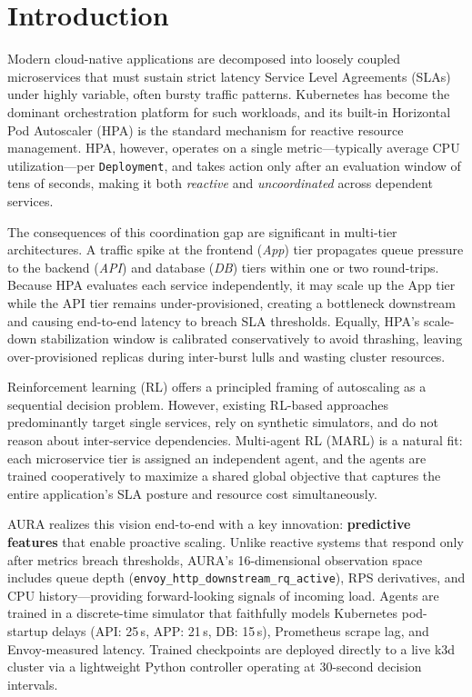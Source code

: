 \documentclass[conference]{IEEEtran}
\begin{document}
\section{Introduction}
\label{sec:intro}

Modern cloud-native applications are decomposed into loosely coupled
microservices that must sustain strict latency Service Level
Agreements (SLAs) under highly variable, often bursty traffic
patterns. Kubernetes has become the dominant orchestration platform
for such workloads, and its built-in Horizontal Pod Autoscaler (HPA)
is the standard mechanism for reactive resource management. HPA,
however, operates on a single metric---typically average CPU
utilization---per \texttt{Deployment}, and takes action only after an
evaluation window of tens of seconds, making it both \emph{reactive}
and \emph{uncoordinated} across dependent services.

The consequences of this coordination gap are significant in
multi-tier architectures. A traffic spike at the frontend
(\emph{App}) tier propagates queue pressure to the backend
(\emph{API}) and database (\emph{DB}) tiers within one or two
round-trips. Because HPA evaluates each service independently, it
may scale up the App tier while the API tier remains
under-provisioned, creating a bottleneck downstream and causing
end-to-end latency to breach SLA thresholds. Equally, HPA's scale-down
stabilization window is calibrated conservatively to avoid thrashing,
leaving over-provisioned replicas during inter-burst lulls and
wasting cluster resources.

Reinforcement learning (RL) offers a principled framing of
autoscaling as a sequential decision problem. However, existing
RL-based approaches~\cite{Rossi2019,Toka2021,Horovitz2022}
predominantly target single services, rely on synthetic simulators,
and do not reason about inter-service dependencies. Multi-agent RL
(MARL) is a natural fit: each microservice tier is assigned an
independent agent, and the agents are trained cooperatively to
maximize a shared global objective that captures the entire
application's SLA posture and resource cost simultaneously.

AURA realizes this vision end-to-end with a key innovation:
\textbf{predictive features} that enable proactive scaling. Unlike
reactive systems that respond only after metrics breach thresholds,
AURA's 16-dimensional observation space includes queue depth
(\texttt{envoy\_http\_downstream\_rq\_active}), RPS derivatives, and
CPU history---providing forward-looking signals of incoming load.
Agents are trained in a discrete-time simulator that faithfully models
Kubernetes pod-startup delays (API: 25\,s, APP: 21\,s, DB: 15\,s),
Prometheus scrape lag, and Envoy-measured latency. Trained checkpoints
are deployed directly to a live k3d cluster via a lightweight Python
controller operating at 30-second decision intervals.
\end{document}
